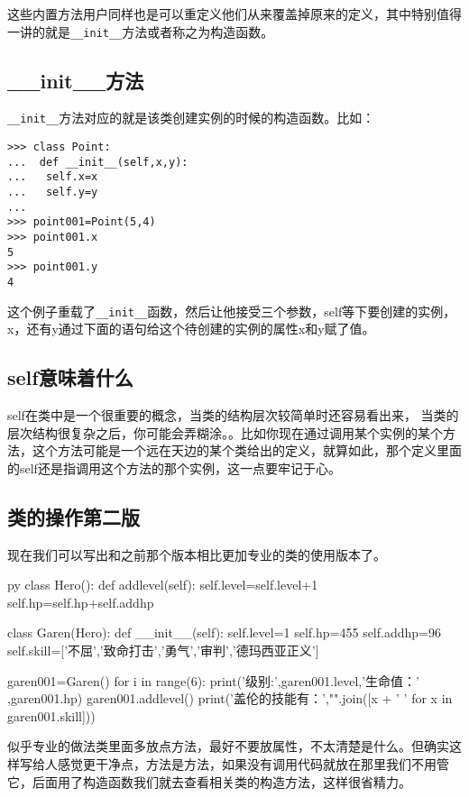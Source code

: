 \documentclass[12pt,oneside]{book}
\begin{document}
\begin{common-format}
这些内置方法用户同样也是可以重定义他们从来覆盖掉原来的定义，其中特别值得一讲的就是\verb+__init__+方法或者称之为构造函数。

\subsection{\_\_init\_\_{}方法}
\verb+__init__+方法对应的就是该类创建实例的时候的构造函数。比如：
\begin{Verbatim}
>>> class Point:
...  def __init__(self,x,y):
...   self.x=x
...   self.y=y
... 
>>> point001=Point(5,4)
>>> point001.x
5
>>> point001.y
4
\end{Verbatim}
这个例子重载了\verb+__init__+函数，然后让他接受三个参数，self等下要创建的实例，x，还有y通过下面的语句给这个待创建的实例的属性x和y赋了值。


\subsection{self意味着什么}
self在类中是一个很重要的概念，当类的结构层次较简单时还容易看出来， 当类的层次结构很复杂之后，你可能会弄糊涂。。比如你现在通过调用某个实例的某个方法，这个方法可能是一个远在天边的某个类给出的定义，就算如此，那个定义里面的self还是指调用这个方法的那个实例，这一点要牢记于心。



\subsection{类的操作第二版}
现在我们可以写出和之前那个版本相比更加专业的类的使用版本了。
\begin{xverbatim}[129]{py}
class Hero():
    def addlevel(self):
        self.level=self.level+1
        self.hp=self.hp+self.addhp

class Garen(Hero):
    def __init__(self):
        self.level=1
        self.hp=455
        self.addhp=96
        self.skill=['不屈','致命打击','勇气','审判','德玛西亚正义']

garen001=Garen()
for i in range(6):
    print('级别:',garen001.level,'生命值：' ,garen001.hp)
    garen001.addlevel()
print('盖伦的技能有：',"".join([x + '  ' for x in garen001.skill]))
\end{xverbatim}

似乎专业的做法类里面多放点方法，最好不要放属性，不太清楚是什么。但确实这样写给人感觉更干净点，方法是方法，如果没有调用代码就放在那里我们不用管它，后面用了构造函数我们就去查看相关类的构造方法，这样很省精力。



\end{common-format}
\end{document}
